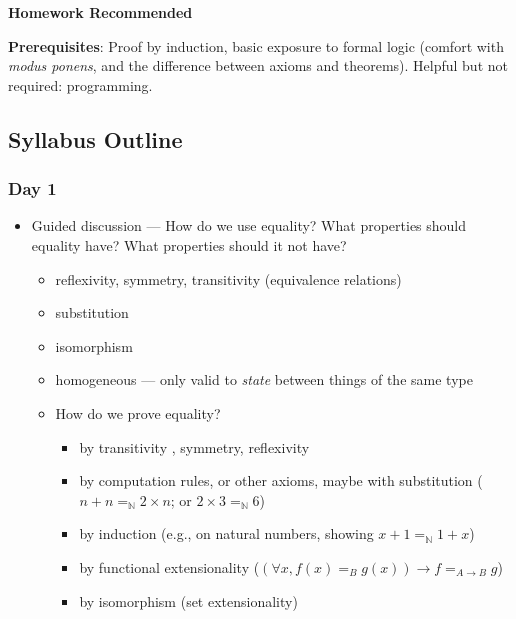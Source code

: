 \documentclass{article}
\begin{document}
\noindent\textbf{Homework Recommended}

\noindent\textbf{Prerequisites}: Proof by induction, basic exposure to formal logic (comfort with \textit{modus ponens}, and the difference between axioms and theorems).  Helpful but not required: programming.

\subsection*{Syllabus Outline}

\subsubsection*{Day 1}
\begin{itemize}
  \item
    Guided discussion --- How do we use equality?  What properties should equality have?  What properties should it not have?
    \begin{itemize}
      \item reflexivity, symmetry, transitivity (equivalence relations)
      \item substitution
      \item isomorphism
      \item homogeneous --- only valid to \emph{state} between things of the same type
      \item How do we prove equality?
      \begin{itemize}
        \item by transitivity%
        , symmetry, reflexivity
        \item by computation rules, or other axioms, maybe with substitution ($n + n =_{\mathbb{N}} 2 \times n$; or $2 \times 3 =_{\mathbb{N}} 6$)
        \item by induction (e.g., on natural numbers, showing $x + 1 =_{\mathbb{N}} 1 + x$)
        \item by functional extensionality ($(\forall x, f(x) =_{B} g(x)) \to f =_{A \to B} g$)
        \item by isomorphism (set extensionality)
      \end{itemize}

\end{itemize}
\end{itemize}
\end{document}
